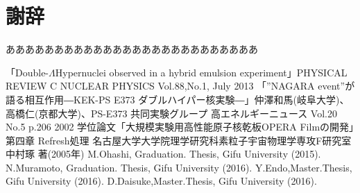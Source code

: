 \documentclass[12pt,a4paper]{jarticle}
\begin{document}
\section*{謝辞}
ああああああああああああああああああああああああああ
\begin{thebibliography}{99}
 「Double-$\Lambda$Hypernuclei observed in a hybrid emulsion experiment」PHYSICAL REVIEW C NUCLEAR PHYSICS Vol.88,No.1, July 2013
 「”NAGARA event”が語る相互作用―KEK-PS E373 ダブルハイパー核実験―」仲澤和馬(岐阜大学)、高橋仁(京都大学)、PS-E373 共同実験グループ 高エネルギーニュース Vol.20 No.5 p.206 2002
 学位論文「大規模実験用高性能原子核乾板OPERA Filmの開発」第四章 Refresh処理 名古屋大学大学院理学研究科素粒子宇宙物理学専攻F研究室 中村琢 著(2005年)
 M.Ohashi, Graduation. Thesis, Gifu University (2015).
 N.Muramoto, Graduation. Thesis, Gifu University (2016).
 Y.Endo,Master.Thesis, Gifu University (2016).
 D.Daisuke,Master.Thesis, Gifu University (2016).
\end{thebibliography}
\end{document}
